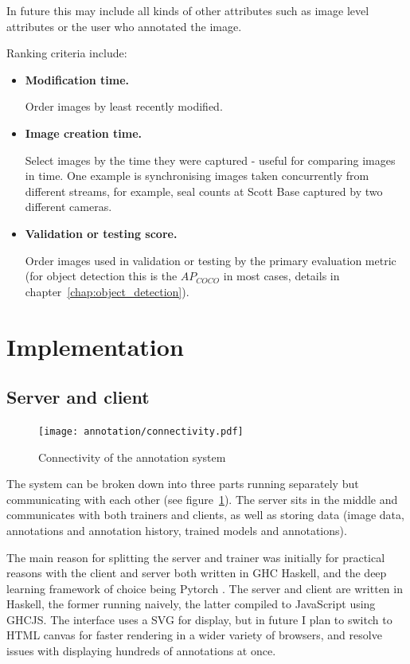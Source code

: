 In future this may include all kinds of other attributes such as image level attributes or the user who annotated the image.

Ranking criteria include:

\begin{itemize}
    \item {\bf Modification time.} \par
Order images by least recently modified.
    \item {\bf Image creation time. } \par
Select images by the time they were captured - useful for comparing images in time. One example is synchronising images taken concurrently from different streams, for example, seal counts at Scott Base captured by two different cameras.
    \item {\bf Validation or testing score. } \par
Order images used in validation or testing by the primary evaluation metric (for object detection this is the $AP_{COCO}$ in most cases, details in chapter~\ref{chap:object_detection}).
\end{itemize}

\section {Implementation}

\subsection{Server and client}

\begin{figure}[h!]
  \centering
  \texttt{[image: annotation/connectivity.pdf]}
  \caption{Connectivity of the annotation system}  
  \label{fig:connectivity}
\end{figure}

The system can be broken down into three parts running separately but communicating with each other (see figure~\ref{fig:connectivity}). The server sits in the middle and communicates with both trainers and clients, as well as storing data (image data, annotations and annotation history, trained models and annotations).

The main reason for splitting the server and trainer was initially for practical reasons with the client and server both written in \gls{GHC} Haskell, and the deep learning framework of choice being Pytorch \cite{Paszke2017}. The server and client are written in Haskell, the former running naively, the latter compiled to JavaScript using \gls{GHCJS}. The interface uses a \gls{SVG} for display, but in future I plan to switch to \gls{HTML} canvas for faster rendering in a wider variety of browsers, and resolve issues with displaying hundreds of annotations at once.

